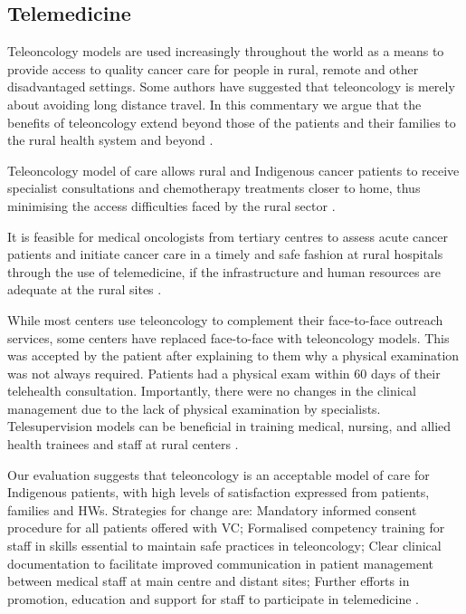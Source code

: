 \subsection{Telemedicine}

Teleoncology models are used increasingly throughout the world as a means to provide access to quality cancer care for people in rural, remote and other disadvantaged settings. Some authors have suggested that teleoncology is merely about avoiding long distance travel. In this commentary we argue that the benefits of teleoncology extend beyond those of the patients and their families to the rural health system and beyond \cite{sabesan_are_2014}.

Teleoncology model of care allows rural and Indigenous cancer patients to receive specialist consultations and chemotherapy treatments closer to home, thus minimising the access difficulties faced by the rural sector \cite{sabesan_telemedicine_2012}.

It is feasible for medical oncologists from tertiary centres to assess acute cancer patients and initiate cancer care in a timely and safe fashion at rural hospitals through the use of telemedicine, if the infrastructure and human resources are adequate at the rural sites \cite{sabesan_timely_2014}.

While most centers use teleoncology to complement their face-to-face outreach services, some centers have replaced face-to-face with teleoncology models. This was accepted by the patient after explaining to them why a physical examination was not always required. Patients had a physical exam within 60 days of their telehealth consultation. Importantly, there were no changes in the clinical management due to the lack of physical examination by specialists. Telesupervision models can be beneficial in training medical, nursing, and allied health trainees and staff at rural centers \cite{sabesan_medical_2014}.

Our evaluation suggests that teleoncology is an acceptable model of care for Indigenous patients, with high levels of satisfaction expressed from patients, families and HWs. Strategies for change are: Mandatory informed consent procedure for all patients offered with VC; Formalised competency training for staff in skills essential to maintain safe practices in teleoncology; Clear clinical documentation to facilitate improved communication in patient management between medical staff at main centre and distant sites; Further efforts in promotion, education and support for staff to participate in telemedicine \cite{mooi_teleoncology_2012}.

